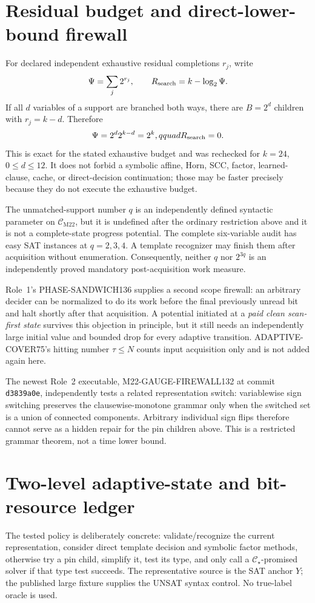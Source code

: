 \documentclass[11pt]{article}
\newcommand{\Cstar}{\mathcal C_\star}
\newcommand{\CM}{\mathcal C_{\mathrm{M22}}}
\begin{document}
\section{Residual budget and direct-lower-bound firewall}
For declared independent exhaustive residual completions $r_j$, write
\[
 \Psi=\sum_j2^{r_j},\qquad R_{\rm search}=k-\log_2\Psi.
\]
If all $d$ variables of a support are branched both ways, there are $B=2^d$
children with $r_j=k-d$.  Therefore
\[
 \Psi=2^d2^{k-d}=2^k,qquad R_{\rm search}=0.
\]
This is exact for the stated exhaustive budget and was rechecked for
$k=24$, $0\le d\le12$.  It does not forbid a symbolic affine, Horn, SCC,
factor, learned-clause, cache, or direct-decision continuation; those may be
faster precisely because they do not execute the exhaustive budget.

The unmatched-support number $q$ is an independently defined syntactic
parameter on $\CM$, but it is undefined after the ordinary restriction above
and it is not a complete-state progress potential.  The complete six-variable
audit has easy SAT instances at $q=2,3,4$.  A template recognizer may finish
them after acquisition without enumeration.  Consequently, neither $q$ nor
$2^{3q}$ is an independently proved mandatory post-acquisition work measure.

Role~1's PHASE-SANDWICH136 supplies a second scope firewall: an arbitrary
decider can be normalized to do its work before the final previously unread
bit and halt shortly after that acquisition.  A potential initiated at a
\emph{paid clean scan-first state} survives this objection in principle, but it
still needs an independently large initial value and bounded drop for every
adaptive transition.  ADAPTIVE-COVER75's hitting number $\tau\le N$ counts
input acquisition only and is not added again here.

The newest Role~2 executable, M22-GAUGE-FIREWALL132 at commit
\texttt{d3839a0e}, independently tests a related representation switch:
variablewise sign switching preserves the clausewise-monotone grammar only
when the switched set is a union of connected components.  Arbitrary
individual sign flips therefore cannot serve as a hidden repair for the pin
children above.  This is a restricted grammar theorem, not a time lower bound.

\section{Two-level adaptive-state and bit-resource ledger}
The tested policy is deliberately concrete: validate/recognize the current
representation, consider direct template decision and symbolic factor methods,
otherwise try a pin child, simplify it, test its type, and only call a
$\Cstar$-promised solver if that type test succeeds.  The representative
source is the SAT anchor $Y$; the published large fixture supplies the UNSAT
syntax control.  No true-label oracle is used.
\end{document}
